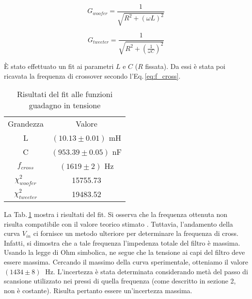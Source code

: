 \documentclass[../Relazione_circuiti]{subfiles}
\begin{document}
  \begin{equation}
    \label{eq:gain_woofer}
    G_{woofer} = \frac{1}{\sqrt{R^2+(\omega L)^2}}
  \end{equation}

  \begin{equation}
    \label{eq:gain_tweeter}
    G_{tweeter} = \frac{1}{\sqrt{R^2+(\frac{1}{\omega C})^2}}
  \end{equation}



  È stato effettuato un fit ai parametri $L$ e $C$ ($R$ fissata).
  Da essi è stata poi ricavata la frequenza di crossover secondo l'Eq.\,\eqref{eq:f_cross}.

  \begin{table}[H]
    \centering

    \begin{tabular}{c | c }

      Grandezza & Valore                 \\

      L         & $(10.13 \pm 0.01)$ mH  \\
      C         & $(953.39 \pm 0.05)$ nF \\
      $f_{cross}$ & $(1619 \pm 2)$ Hz \\
	$\chi^2_{woofer}$	& 15755.73  \\
	$\chi^2_{tweeter}$ & 19483.52  

    \end{tabular}

    \caption{Risultati del fit alle funzioni guadagno in tensione}
    \label{tab:fit_amplitude}

  \end{table}

  La Tab.\,\ref{tab:fit_amplitude} mostra i risultati del fit.
  Si osserva che la frequenza ottenuta non risulta compatibile con il valore teorico stimato \theoryF.
  Tuttavia, l'andamento della curva $V_{in}$ ci fornisce un metodo ulteriore per determinare la frequenza di cross.
  Infatti, si dimostra che a tale frequenza l'impedenza totale del filtro è massima.
  Usando la legge di Ohm simbolica, ne segue che la tensione ai capi del filtro deve essere massima.
  Cercando il massimo della curva sperimentale, otteniamo il valore $(1434 \pm 8) \;$ Hz.
  L'incertezza è stata determinata considerando metà del passo di scansione utilizzato nei pressi di quella frequenza
  (come descritto in sezione 2, non è costante). Risulta pertanto essere un'incertezza massima.
  
\end{document}
